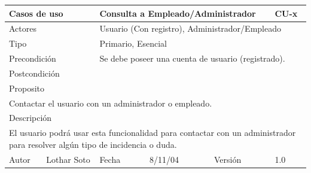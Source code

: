 \documentclass{article}
\begin{document}
\begin{table}[h]
\begin{tabular}{|l|l|l|l|l|l|}
\hline
\multicolumn{2}{|p{2cm}|}{Casos de uso}  & \multicolumn{3}{p{7cm}|}{Consulta a Empleado/Administrador} & CU-x \\
\hline
\multicolumn{2}{|p{2cm}|}{Actores}       & \multicolumn{4}{p{8cm}|}{Usuario (Con registro), Administrador/Empleado}        \\
\hline
\multicolumn{2}{|p{2cm}|}{Tipo}          & \multicolumn{4}{p{8cm}|}{Primario, Esencial}        \\
\hline
\multicolumn{2}{|p{2cm}|}{Precondición}  & \multicolumn{4}{p{8cm}|}{Se debe poseer una cuenta de usuario (registrado).}        \\
\hline
\multicolumn{2}{|p{2cm}|}{Postcondición} & \multicolumn{4}{p{8cm}|}{}        \\
\hline
\multicolumn{6}{|p{10cm}|}{Proposito}                                   \\
\hline
\multicolumn{6}{|p{10cm}|}{Contactar el usuario con un administrador o empleado.}                                            \\
\hline
\multicolumn{6}{|p{10cm}|}{Descripción}                                 \\
\hline
\multicolumn{6}{|p{10cm}|}{El usuario podrá usar esta funcionalidad para contactar con un administrador para resolver algún tipo de incidencia o duda.}                                            \\
\hline
Autor          &       Lothar Soto        & Fecha    &  8/11/04   &   Versión  & 1.0\\    
\hline
\end{tabular}
\end{table}
\end{document}
